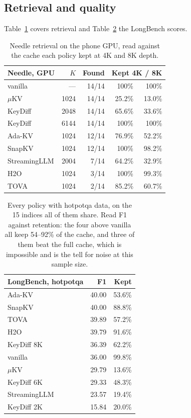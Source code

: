 \documentclass[11pt]{article}
\begin{document}
\subsection{Retrieval and quality}
Table~\ref{tab:niah} covers retrieval and Table~\ref{tab:longbench} the LongBench scores.
\begin{table}[h]\centering\small
\caption{Needle retrieval on the phone GPU, read against the cache each policy kept at 4K and
8K depth.}
\label{tab:niah}
\begin{tabular}{@{}lrrrr@{}}
\toprule
\textbf{Needle, GPU} & $K$ & \textbf{Found} & \multicolumn{2}{c}{\textbf{Kept 4K / 8K}}\\
\midrule
vanilla                 & ---  & 14/14 & 100\%  & 100\%\\
\rowcolor{cA!8} $\mu$KV & 1024 & 14/14 & 25.2\% & 13.0\%\\
KeyDiff                 & 2048 & 14/14 & 65.6\% & 33.6\%\\
KeyDiff                 & 6144 & 14/14 & 100\%  & 100\%\\
Ada-KV                  & 1024 & 12/14 & 76.9\% & 52.2\%\\
SnapKV                  & 1024 & 12/14 & 100\%  & 98.2\%\\
StreamingLLM            & 2004 & 7/14  & 64.2\% & 32.9\%\\
H2O                     & 1024 & 3/14  & 100\%  & 99.3\%\\
TOVA                    & 1024 & 2/14  & 85.2\% & 60.7\%\\
\bottomrule
\end{tabular}
\end{table}

\begin{table}[h]\centering\small
\caption{Every policy with hotpotqa data, on the 15 indices all of them share. Read F1
against retention: the four above vanilla all keep 54--92\% of the cache, and three of them
beat the full cache, which is impossible and is the tell for noise at this sample size.}
\label{tab:longbench}
\begin{tabular}{@{}lrr@{}}
\toprule
\textbf{LongBench, hotpotqa} & \textbf{F1} & \textbf{Kept}\\
\midrule
Ada-KV                 & 40.00 & 53.6\%\\
SnapKV                 & 40.00 & 88.8\%\\
TOVA                   & 39.89 & 57.2\%\\
H2O                    & 39.79 & 91.6\%\\
KeyDiff 8K             & 36.39 & 62.2\%\\
vanilla                & 36.00 & 99.8\%\\
\rowcolor{cA!8} $\mu$KV & 29.79 & 13.6\%\\
KeyDiff 6K             & 29.33 & 48.3\%\\
StreamingLLM           & 23.57 & 19.4\%\\
KeyDiff 2K             & 15.84 & 20.0\%\\
\bottomrule
\end{tabular}
\end{table}
\end{document}
